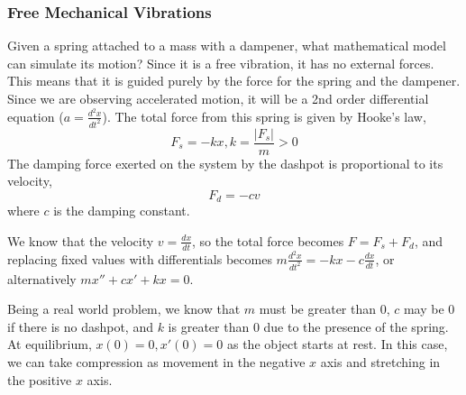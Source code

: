 \documentclass{article}
\begin{document}
\subsubsection{Free Mechanical Vibrations}
Given a spring attached to a mass with a dampener, what mathematical model can simulate its motion? Since it is a free vibration, it has no external forces. This means that it is guided purely by the force for the spring and the dampener.
Since we are observing accelerated motion, it will be a 2nd order differential equation ($a=\frac{d^2x}{dt^2}$).
The total force from this spring is given by Hooke's law, 
\begin{equation} F_s = -kx, k=\frac{|F_s|}{m} > 0 \end{equation}
The damping force exerted on the system by the dashpot is proportional to its velocity,
\begin{equation} F_d = -cv \end{equation}
where $c$ is the damping constant.

We know that the velocity $v=\frac{dx}{dt}$, so the total force becomes $F=F_s+F_d$, and replacing fixed values with differentials becomes $m \frac{d^2x}{dt^2} = -kx -c \frac{dx}{dt}$, or alternatively $mx''+cx'+kx=0$.

Being a real world problem, we know that $m$ must be greater than 0, $c$ may be 0 if there is no dashpot, and $k$ is greater than 0 due to the presence of the spring.
At equilibrium, $x(0)=0, x'(0)=0$ as the object starts at rest. In this case, we can take compression as movement in the negative $x$ axis and stretching in the positive $x$ axis.
\end{document}

